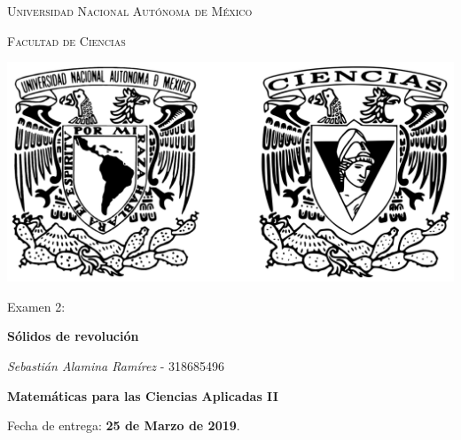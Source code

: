 \documentclass[10pt,letterpaper]{article}
\begin{document}
\begin{titlepage}
    \centering

    {\scshape\LARGE Universidad Nacional Autónoma de México \par}

    \vspace{1cm}
    {\scshape\Large Facultad de Ciencias\par}
    \vspace{1.5cm}

    \begin{center}
        \includegraphics[scale=.1]{Images/logo.png}
    \end{center}

    \vspace{.8 cm}

    {\LARGE Examen 2: \par}
    {\huge\bfseries Sólidos de revolución \par}

    \vspace{0.5cm}
    \large{\itshape{Sebastián Alamina Ramírez}} \small{ - 318685496} \\ \vspace{0.3cm}

    \vfill

    \textbf{Matemáticas para las Ciencias Aplicadas II}
    \par
    \vspace{0.5cm}
    Fecha de entrega: \textbf{25 de Marzo de 2019}.
\end{titlepage}
\end{document}

